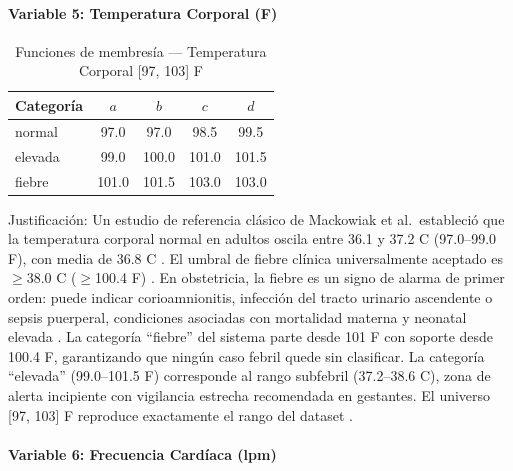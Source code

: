 \documentclass[11pt]{article}
\begin{document}
\paragraph{Variable 5: Temperatura Corporal (\textdegree F)}

\begin{table}[H]
    \centering
    \caption{Funciones de membres\'ia --- Temperatura Corporal [97, 103] \textdegree F}
    \begin{tabular}{lcccc}
        \toprule
        \textbf{Categoría} & $a$   & $b$   & $c$   & $d$   \\
        \midrule
        normal             & 97.0  & 97.0  & 98.5  & 99.5  \\
        elevada            & 99.0  & 100.0 & 101.0 & 101.5 \\
        fiebre             & 101.0 & 101.5 & 103.0 & 103.0 \\
        \bottomrule
    \end{tabular}
    \par{}
\end{table}

Justificaci\'on: Un estudio de referencia cl\'asico de Mackowiak et al.\ estableci\'o que la temperatura corporal normal en adultos oscila entre 36.1 y 37.2 \textdegree C (97.0--99.0 \textdegree F), con media de 36.8 \textdegree C \cite{mackowiak1992}. El umbral de fiebre cl\'inica universalmente aceptado es $\geq$38.0 \textdegree C ($\geq$100.4 \textdegree F) \cite{mackowiak1992}. En obstetricia, la fiebre es un signo de alarma de primer orden: puede indicar corioamnionitis, infecci\'on del tracto urinario ascendente o sepsis puerperal, condiciones asociadas con mortalidad materna y neonatal elevada \cite{soper2009}. La categor\'ia ``fiebre'' del sistema parte desde 101 \textdegree F con soporte desde 100.4 \textdegree F, garantizando que ning\'un caso febril quede sin clasificar. La categor\'ia ``elevada'' (99.0--101.5 \textdegree F) corresponde al rango subfebril (37.2--38.6 \textdegree C), zona de alerta incipiente con vigilancia estrecha recomendada en gestantes. El universo [97, 103] \textdegree F reproduce exactamente el rango del dataset \cite{ahmed2020}.

\paragraph{Variable 6: Frecuencia Cardíaca (lpm)}
\end{document}

